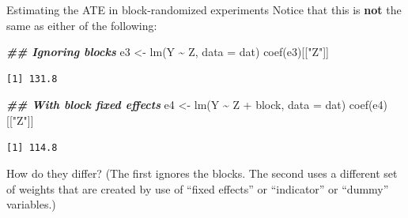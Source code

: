 \documentclass[
  ignorenonframetext,
]{beamer}
\newenvironment{Shaded}{\begin{snugshade}}{\end{snugshade}}
\newcommand{\AttributeTok}[1]{\textcolor[rgb]{0.77,0.63,0.00}{#1}}
\newcommand{\DocumentationTok}[1]{\textcolor[rgb]{0.56,0.35,0.01}{\textbf{\textit{#1}}}}
\newcommand{\FunctionTok}[1]{\textcolor[rgb]{0.00,0.00,0.00}{#1}}
\newcommand{\NormalTok}[1]{#1}
\newcommand{\OtherTok}[1]{\textcolor[rgb]{0.56,0.35,0.01}{#1}}
\newcommand{\SpecialCharTok}[1]{\textcolor[rgb]{0.00,0.00,0.00}{#1}}
\newcommand{\StringTok}[1]{\textcolor[rgb]{0.31,0.60,0.02}{#1}}
\begin{document}
\begin{frame}[fragile]{Estimating the ATE in block-randomized
experiments}
\protect\hypertarget{estimating-the-ate-in-block-randomized-experiments-3}{}
Notice that this is \textbf{not} the same as either of the following:

\scriptsize

\begin{Shaded}
\begin{Highlighting}[]
\DocumentationTok{\#\# Ignoring blocks}
\NormalTok{e3 }\OtherTok{\textless{}{-}} \FunctionTok{lm}\NormalTok{(Y }\SpecialCharTok{\textasciitilde{}}\NormalTok{ Z, }\AttributeTok{data =}\NormalTok{ dat)}
\FunctionTok{coef}\NormalTok{(e3)[[}\StringTok{"Z"}\NormalTok{]]}
\end{Highlighting}
\end{Shaded}

\begin{verbatim}
[1] 131.8
\end{verbatim}

\begin{Shaded}
\begin{Highlighting}[]
\DocumentationTok{\#\# With block fixed effects}
\NormalTok{e4 }\OtherTok{\textless{}{-}} \FunctionTok{lm}\NormalTok{(Y }\SpecialCharTok{\textasciitilde{}}\NormalTok{ Z }\SpecialCharTok{+}\NormalTok{ block, }\AttributeTok{data =}\NormalTok{ dat)}
\FunctionTok{coef}\NormalTok{(e4)[[}\StringTok{"Z"}\NormalTok{]]}
\end{Highlighting}
\end{Shaded}

\begin{verbatim}
[1] 114.8
\end{verbatim}

\normalsize

How do they differ? (The first ignores the blocks. The second uses a
different set of weights that are created by use of ``fixed effects'' or
``indicator'' or ``dummy'' variables.)
\end{frame}
\end{document}
